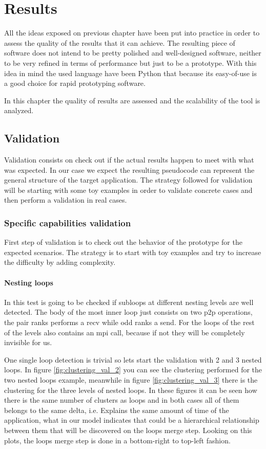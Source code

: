 \chapter{Results}

All the ideas exposed on previous chapter have been put into practice in order
to assess the quality of the results that it can achieve. The resulting piece of
software does not intend to be pretty polished and well-designed software,
neither to be very refined in terms of performance but just to be a prototype.
With this idea in mind the used language have been Python that because its
easy-of-use is a good choice for rapid prototyping software.

In this chapter the quality of results are assessed and the scalability
of the tool is analyzed.

\section{Validation}\label{s:validation}

Validation consists on check out if the actual results happen to meet with what
was expected. In our case we expect the resulting pseudocode can represent the
general structure of the target application. The strategy followed for
validation will be starting with some toy examples in order to validate concrete
cases and then perform a validation in real cases.

\subsection{Specific capabilities validation}

First step of validation is to check out the behavior of the prototype for 
the expected scenarios. The strategy is to start with toy examples and try to
increase the difficulty by adding complexity.

\subsubsection{Nesting loops}

In this test is going to be checked if subloops at different nesting levels are
well detected. The body of the most inner loop just consists on two p2p operations, the
pair ranks performs a recv while odd ranks a send. For the loops of the rest of
the levels also contains an mpi call, because if not they will be completely
invisible for us. 

One single loop detection is trivial so lets start the validation with 2 and 3 nested
loops. In figure \ref{fig:clustering_val_2} you can see the clustering performed
for the two nested loops example, meanwhile in figure
\ref{fig:clustering_val_3} there is the clustering for the three levels of
nested loops. In these figures it can be seen how there is the
same number of clusters as loops and in both cases all of them belongs to the
same delta, i.e. Explains the same amount of time of the application, what in our
model indicates that could be a hierarchical relationship between them that will
be discovered on the loops merge step. Looking on this plots, the loops merge
step is done in a bottom-right to top-left fashion.

